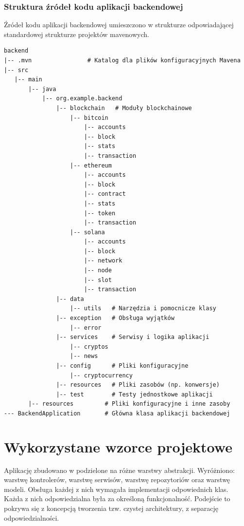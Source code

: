 \subsubsection{Struktura źródeł kodu aplikacji backendowej}
Źródeł kodu aplikacji backendowej umieszczono w strukturze odpowiadającej standardowej strukturze projektów mavenowych.
\begin{lstlisting}[basicstyle=\footnotesize\ttfamily]
backend
|-- .mvn                # Katalog dla plików konfiguracyjnych Mavena
|-- src
   |-- main
       |-- java
           |-- org.example.backend
               |-- blockchain   # Moduły blockchainowe
                   |-- bitcoin
                       |-- accounts
                       |-- block
                       |-- stats
                       |-- transaction
                   |-- ethereum
                       |-- accounts
                       |-- block
                       |-- contract
                       |-- stats
                       |-- token
                       |-- transaction
                   |-- solana
                       |-- accounts
                       |-- block
                       |-- network
                       |-- node
                       |-- slot
                       |-- transaction
               |-- data
                   |-- utils   # Narzędzia i pomocnicze klasy
               |-- exception   # Obsługa wyjątków
                   |-- error
               |-- services    # Serwisy i logika aplikacji
                   |-- cryptos
                   |-- news
               |-- config      # Pliki konfiguracyjne
                   |-- cryptocurrency
               |-- resources   # Pliki zasobów (np. konwersje)
               |-- test        # Testy jednostkowe aplikacji
       |-- resources         # Pliki konfiguracyjne i inne zasoby
--- BackendApplication       # Główna klasa aplikacji backendowej
\end{lstlisting}



\section{Wykorzystane wzorce projektowe}
Aplikację zbudowano w podzielone na różne warstwy abstrakcji. Wyróżniono: warstwę kontrolerów, warstwę serwisów, warstwę repozytoriów oraz warstwę modeli. Obsługa każdej z nich wymagała implementacji odpowiednich klas. Każda z nich odpowiedzialna była za określoną funkcjonalność. Podejście to pokrywa się z koncepcją tworzenia tzw. czystej architektury, z separację odpowiedzialności. 

